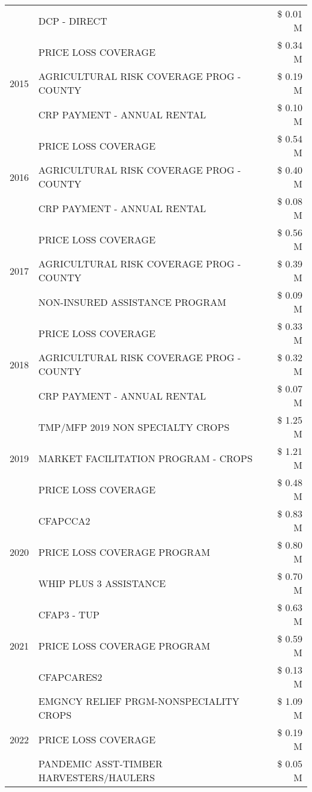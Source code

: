 \begin{tabular}{llr}
 & DCP - DIRECT & \$ 0.01 M \\
\cline{1-3}
\multirow[t]{3}{*}{2015} & PRICE LOSS COVERAGE & \$ 0.34 M \\
 & AGRICULTURAL RISK COVERAGE PROG - COUNTY & \$ 0.19 M \\
 & CRP PAYMENT - ANNUAL RENTAL & \$ 0.10 M \\
\cline{1-3}
\multirow[t]{3}{*}{2016} & PRICE LOSS COVERAGE & \$ 0.54 M \\
 & AGRICULTURAL RISK COVERAGE PROG - COUNTY & \$ 0.40 M \\
 & CRP PAYMENT - ANNUAL RENTAL & \$ 0.08 M \\
\cline{1-3}
\multirow[t]{3}{*}{2017} & PRICE LOSS COVERAGE & \$ 0.56 M \\
 & AGRICULTURAL RISK COVERAGE PROG - COUNTY & \$ 0.39 M \\
 & NON-INSURED ASSISTANCE PROGRAM & \$ 0.09 M \\
\cline{1-3}
\multirow[t]{3}{*}{2018} & PRICE LOSS COVERAGE & \$ 0.33 M \\
 & AGRICULTURAL RISK COVERAGE PROG - COUNTY & \$ 0.32 M \\
 & CRP PAYMENT - ANNUAL RENTAL & \$ 0.07 M \\
\cline{1-3}
\multirow[t]{3}{*}{2019} & TMP/MFP 2019 NON SPECIALTY CROPS & \$ 1.25 M \\
 & MARKET FACILITATION PROGRAM - CROPS & \$ 1.21 M \\
 & PRICE LOSS COVERAGE & \$ 0.48 M \\
\cline{1-3}
\multirow[t]{3}{*}{2020} & CFAPCCA2 & \$ 0.83 M \\
 & PRICE LOSS COVERAGE PROGRAM & \$ 0.80 M \\
 & WHIP PLUS 3 ASSISTANCE & \$ 0.70 M \\
\cline{1-3}
\multirow[t]{3}{*}{2021} & CFAP3 - TUP & \$ 0.63 M \\
 & PRICE LOSS COVERAGE PROGRAM & \$ 0.59 M \\
 & CFAPCARES2 & \$ 0.13 M \\
\cline{1-3}
\multirow[t]{3}{*}{2022} & EMGNCY RELIEF PRGM-NONSPECIALITY CROPS & \$ 1.09 M \\
 & PRICE LOSS COVERAGE & \$ 0.19 M \\
 & PANDEMIC ASST-TIMBER HARVESTERS/HAULERS & \$ 0.05 M \\
\cline{1-3}
\bottomrule
\end{tabular}
